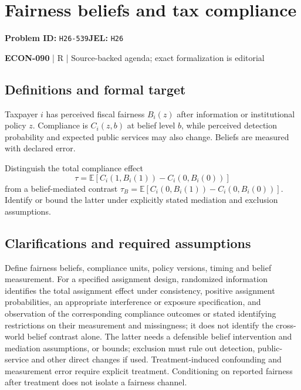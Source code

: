 \documentclass[11pt,a4paper]{article}
\begin{document}
\section*{Fairness beliefs and tax compliance}
\textbf{Problem ID:} \texttt{H26-539}\quad \textbf{JEL:} \texttt{H26}\par
\label{problem:OP-0649}


\label{audited:ECON-090}

{\sffamily\small\color{muted}\textbf{ECON-090} | R | Source-backed agenda; exact formalization is editorial\par}

\subsection*{Definitions and formal target}

Taxpayer $i$ has perceived fiscal fairness $B_i(z)$ after information or institutional policy $z$. Compliance is $C_i(z,b)$ at belief level $b$, while perceived detection probability and expected public services may also change. Beliefs are measured with declared error.

Distinguish the total compliance effect
\[
 \tau=\mathbb E[C_i(1,B_i(1))-C_i(0,B_i(0))]
\]
from a belief-mediated contrast $\tau_B=\mathbb E[C_i(0,B_i(1))-C_i(0,B_i(0))]$. Identify or bound the latter under explicitly stated mediation and exclusion assumptions.

\subsection*{Clarifications and required assumptions}

Define fairness beliefs, compliance units, policy versions, timing and belief measurement. For a specified assignment design, randomized information identifies the total assignment effect under consistency, positive assignment probabilities, an appropriate interference or exposure specification, and observation of the corresponding compliance outcomes or stated identifying restrictions on their measurement and missingness; it does not identify the cross-world belief contrast alone. The latter needs a defensible belief intervention and mediation assumptions, or bounds; exclusion must rule out detection, public-service and other direct changes if used. Treatment-induced confounding and measurement error require explicit treatment. Conditioning on reported fairness after treatment does not isolate a fairness channel.
\end{document}
